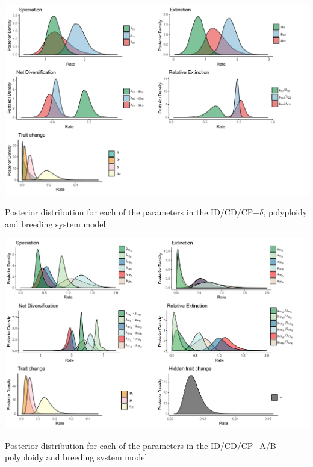 
\begin{suppfigure}
\includegraphics[width=\textwidth]{musseDPSIposteriordist.pdf}
\caption{Posterior distribution for each of the parameters in the ID/CD/CP+$\delta$, polyploidy and breeding system model} %
\label{suppfigure:IDCDCP}
\end{suppfigure}



\begin{suppfigure}
\includegraphics[width=\textwidth]{muhisseDPSInodipposteriordist.pdf}
\caption{Posterior distribution for each of the parameters in the ID/CD/CP+A/B polyploidy and breeding system model} %
\label{suppfigure:IDCDCPnodipAB}
\end{suppfigure}

